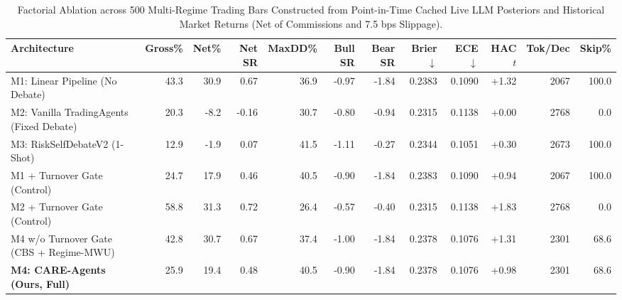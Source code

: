 \begin{table}[t]
\centering
\caption{Factorial Ablation across 500 Multi-Regime Trading Bars Constructed from Point-in-Time Cached Live LLM Posteriors and Historical Market Returns (Net of Commissions and 7.5 bps Slippage).}
\label{tab:cph_ablation}
\begin{tabular}{lrrrrrrrrrrr}
\toprule
\textbf{Architecture} & \textbf{Gross\%} & \textbf{Net\%} & \textbf{Net SR} & \textbf{MaxDD\%} & \textbf{Bull SR} & \textbf{Bear SR} & \textbf{Brier $\downarrow$} & \textbf{ECE $\downarrow$} & \textbf{HAC $t$} & \textbf{Tok/Dec} & \textbf{Skip\%} \\
\midrule
M1: Linear Pipeline (No Debate) & 43.3 & 30.9 & 0.67 & 36.9 & -0.97 & -1.84 & 0.2383 & 0.1090 & +1.32 & 2067 & 100.0 \\
M2: Vanilla TradingAgents (Fixed Debate) & 20.3 & -8.2 & -0.16 & 30.7 & -0.80 & -0.94 & 0.2315 & 0.1138 & +0.00 & 2768 & 0.0 \\
M3: RiskSelfDebateV2 (1-Shot) & 12.9 & -1.9 & 0.07 & 41.5 & -1.11 & -0.27 & 0.2344 & 0.1051 & +0.30 & 2673 & 100.0 \\
M1 + Turnover Gate (Control) & 24.7 & 17.9 & 0.46 & 40.5 & -0.90 & -1.84 & 0.2383 & 0.1090 & +0.94 & 2067 & 100.0 \\
M2 + Turnover Gate (Control) & 58.8 & 31.3 & 0.72 & 26.4 & -0.57 & -0.40 & 0.2315 & 0.1138 & +1.83 & 2768 & 0.0 \\
M4 w/o Turnover Gate (CBS + Regime-MWU) & 42.8 & 30.7 & 0.67 & 37.4 & -1.00 & -1.84 & 0.2378 & 0.1076 & +1.31 & 2301 & 68.6 \\
\textbf{M4: CARE-Agents (Ours, Full)} & 25.9 & 19.4 & 0.48 & 40.5 & -0.90 & -1.84 & 0.2378 & 0.1076 & +0.98 & 2301 & 68.6 \\
\bottomrule
\end{tabular}
\end{table}